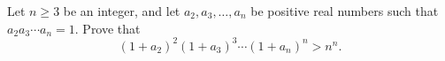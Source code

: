 Let 
$n\ge 3$
 be an integer, and let 
$a_2,a_3,\ldots ,a_n$
 be positive real numbers such that 
$a_{2}a_{3}\cdots a_{n}=1$.
 Prove that
\[(1 + a_2)^2 (1 + a_3)^3 \dotsm (1 + a_n)^n > n^n.\]
